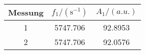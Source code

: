 \label{tab:params}
	\begin{tabular}{S[table-format=1.0]S[table-format=4.3]S[table-format=2.4]}
		\toprule
		{Messung} & {$f_\text{1}/(\si{\second^{-1}})$} & {$A_\text{1}/(\si{a.u.})$} \\
		 & 5747.706 & 92.8953 \\
		 2 & 5747.706 & 92.0576 \\
		\bottomrule
	\end{tabular}
